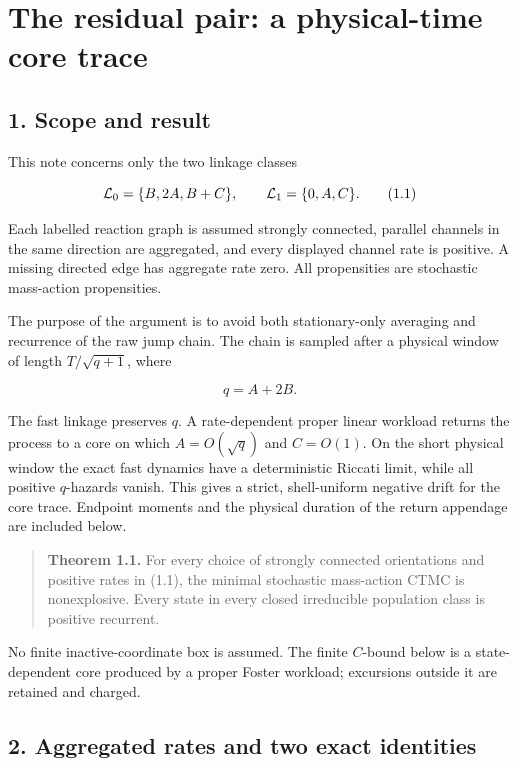 \section{The residual pair: a physical-time core
trace}

\subsection{1. Scope and result}

This note concerns only the two linkage classes

\[
 {\cal L}_0=\{B,2A,B+C\},\qquad
 {\cal L}_1=\{0,A,C\}.                                    \tag{1.1}
\]

Each labelled reaction graph is assumed strongly connected, parallel
channels in the same direction are aggregated, and every displayed
channel rate is positive. A missing directed edge has aggregate rate
zero. All propensities are stochastic mass-action propensities.

The purpose of the argument is to avoid both stationary-only averaging
and recurrence of the raw jump chain. The chain is sampled after a
physical window of length \(T/\sqrt{q+1}\), where

\[
 q=A+2B.                                                     \tag{1.2}
\]

The fast linkage preserves \(q\). A rate-dependent proper linear
workload returns the process to a core on which \(A=O(\sqrt q)\) and
\(C=O(1)\). On the short physical window the exact fast dynamics have a
deterministic Riccati limit, while all positive \(q\)-hazards vanish.
This gives a strict, shell-uniform negative drift for the core trace.
Endpoint moments and the physical duration of the return appendage are
included below.

\begin{quote}
\textbf{Theorem 1.1.} For every choice of strongly connected
orientations and positive rates in (1.1), the minimal stochastic
mass-action CTMC is nonexplosive. Every state in every closed
irreducible population class is positive recurrent.
\end{quote}

No finite inactive-coordinate box is assumed. The finite \(C\)-bound
below is a state-dependent core produced by a proper Foster workload;
excursions outside it are retained and charged.

\subsection{2. Aggregated rates and two exact
identities}

